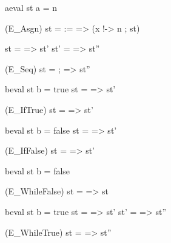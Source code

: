 \documentclass[12pt]{report}
\begin{document}
                           aeval st a = n
\par
\noindent\hrulefill\par
\noindent{}                      (E\_Asgn)
                   st =  :=  => (x !-> n ; st)


                           st  =  => st'
                           st' =  => st''
\par
\noindent\hrulefill\par
\noindent{}                           (E\_Seq)
                         st = ; => st''


                          beval st b = true
                           st =  => st'
\par
\noindent\hrulefill\par
\noindent{}               (E\_IfTrue)
                st =        => st'


                         beval st b = false
                           st =  => st'
\par
\noindent\hrulefill\par
\noindent{}              (E\_IfFalse)
                st =        => st'


                         beval st b = false
\par
\noindent\hrulefill\par
\noindent{}                 (E\_WhileFalse)
                    st =      => st


                          beval st b = true
                           st =  => st'
                  st' =      => st''
\par
\noindent\hrulefill\par
\noindent{}                 (E\_WhileTrue)
                  st  =      => st''
\end{document}

